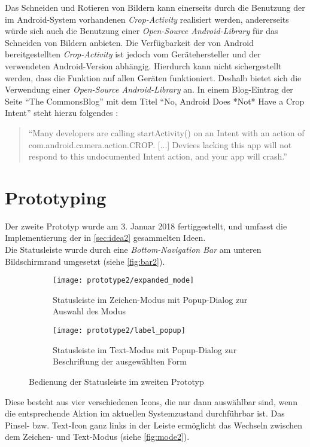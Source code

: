 Das Schneiden und Rotieren von Bildern kann einerseits durch die Benutzung der im Android-System vorhandenen \emph{Crop-Activity} realisiert werden, andererseits würde sich auch die Benutzung einer \emph{Open-Source Android-Library} für das Schneiden von Bildern anbieten.
Die Verfügbarkeit der von Android bereitgestellten \emph{Crop-Activity} ist jedoch vom Gerätehersteller und der verwendeten Android-Version abhängig.
Hierdurch kann nicht sichergestellt werden, dass die Funktion auf allen Geräten funktioniert.
Deshalb bietet sich die Verwendung einer \emph{Open-Source Android-Library} an.
In einem Blog-Eintrag der Seite ``The CommonsBlog'' mit dem Titel ``No, Android Does *Not* Have a Crop Intent'' steht hierzu folgendes \citep{Commonsware13}:
\begin{quote}
  ``Many developers are calling startActivity() on an Intent with an action of com.android.camera.action.CROP.
  [...] Devices lacking this app will not respond to this undocumented Intent action, and your app will crash.'' 
\end{quote}

\section{Prototyping}
Der zweite Prototyp wurde am 3. Januar 2018 fertiggestellt, und umfasst die Implementierung der in \autoref{sec:idea2} gesammelten Ideen. \\

Die Statusleiste wurde durch eine \emph{Bottom-Navigation Bar} am unteren Bildschirmrand umgesetzt (siehe \autoref{fig:bar2}).
\begin{figure}[ht]
  \begin{subfigure}[t]{0.4\textwidth}
    \texttt{[image: prototype2/expanded\_mode]}
    \caption{Statusleiste im Zeichen-Modus mit Popup-Dialog zur Auswahl des Modus}
    \label{fig:mode2}
  \end{subfigure}
  \begin{subfigure}[t]{0.4\textwidth}
    \texttt{[image: prototype2/label\_popup]}
    \caption{Statusleiste im Text-Modus mit Popup-Dialog zur Beschriftung der ausgewählten Form}
    \label{fig:labelp2}
  \end{subfigure}
  \centering
  \caption{Bedienung der Statusleiste im zweiten Prototyp}
  \label{fig:bar2}
\end{figure}
Diese besteht aus vier verschiedenen Icons, die nur dann auswählbar sind, wenn die entsprechende Aktion im aktuellen Systemzustand durchführbar ist.
Das Pinsel- bzw. Text-Icon ganz links in der Leiste ermöglicht das Wechseln zwischen dem Zeichen- und Text-Modus (siehe \autoref{fig:mode2}). \\

